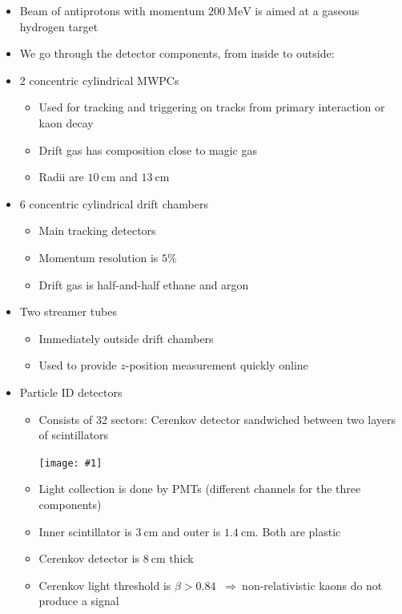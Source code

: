 \documentclass[11pt]{article}
\newcommand{\cm}{\text{cm}}
\newcommand{\mev}{\text{MeV}}
\newcommand{\thus}{\ensuremath{~\Rightarrow~}}
\newcommand{\embedimgw}[2]{\begin{center}\texttt{[image: \#1]}\end{center}}
\begin{document}
\begin{itemize}
  \item Beam of antiprotons with momentum $200~\mev$ is aimed at a gaseous hydrogen target
  \item We go through the detector components, from inside to outside:
  \item 2 concentric cylindrical MWPCs
  \begin{itemize}
    \item Used for tracking and triggering on tracks from primary interaction or kaon decay
    \item Drift gas has composition close to magic gas
    \item Radii are $10~\cm$ and $13~\cm$
  \end{itemize}
  \item 6 concentric cylindrical drift chambers
  \begin{itemize}
    \item Main tracking detectors
    \item Momentum resolution is $5\%$
    \item Drift gas is  half-and-half ethane and argon
  \end{itemize}
  \item Two streamer tubes 
  \begin{itemize}
    \item Immediately outside drift chambers
    \item Used to provide $z$-position measurement quickly online
  \end{itemize}
  \item Particle ID detectors
  \begin{itemize}
    \item Consists of 32 sectors: Cerenkov detector sandwiched between two layers of scintillators
    \embedimgw{figs/cplear_pid.png}{.4}
    \item Light collection is done by PMTs (different channels for the three components)
    \item Inner scintillator is $3~\cm$ and outer is $1.4~\cm$. Both are plastic
    \item Cerenkov detector is $8~\cm$ thick
    \item Cerenkov light threshold is $\beta>0.84$ \thus non-relativistic kaons do not produce a signal
  \end{itemize}
\end{itemize}
\end{document}

